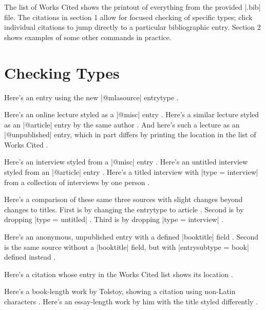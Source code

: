 \documentclass{article}
\begin{document}
The list of Works Cited shows the printout of everything from the provided |.bib| file. The citations in section 1 allow for focused checking of specific types; click individual citations to jump directly to a particular bibliographic entry. Section 2 shows examples of some other commands in practice.

\section{Checking Types}
Here's an entry using the new |@mlasource| entrytype \autocite{mla:shaw}.


Here's an online lecture styled as a |@misc| entry \autocite{elkm}. Here's a similar lecture styled as an |@article| entry by the same author \autocite{elka}. And here's such a lecture as an |@unpublished| entry, which in part differs by printing the location in the list of Works Cited \autocite{elku}.

Here's an interview styled from a |@misc| entry \autocite{misc:smith}. Here's an untitled interview styled from an |@article| entry \autocite{interview:gaitskill}. Here's a titled interview with |type = {interview}| from a collection of interviews by one person \autocite{interview:amis}. 

Here's a comparison of these same three sources with slight changes beyond changes to titles. First is by changing the entrytype to article \autocite[34]{notmisc:smith}. Second is by dropping |type = {untitled}| \autocite{notinterview:gaitskill}. Third is by dropping |type = {interview}| \autocite{notinterview:amis}.

Here's an anonymous, unpublished entry with a defined |booktitle| field \autocite{librodehorasisabel}. Second is the same source without a |booktitle| field, but with |entrysubtype = {book}| defined instead \autocite{librodehorasisabel-2}.

Here's a citation whose entry in the Works Cited list shows its location \autocite{dewey99aa}.

Here's a book-length work by Tolstoy, showing a citation using non-Latin characters \autocite[22]{tolstoy:kreutzer}. Here's an essay-length work by him with the title styled differently \autocite[22]{tolstoy:readers}. 
\end{document}
